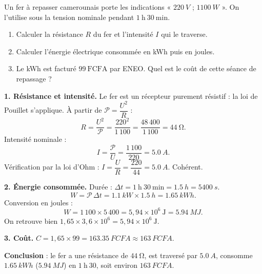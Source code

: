 \documentclass[11pt]{article}
\begin{document}
\begin{exoresolu}
Un fer à repasser camerounais porte les indications « $\SI{220}{V}$ ; $\SI{1100}{W}$ ». On l'utilise sous la tension nominale pendant $1~\mathrm{h}~30~\mathrm{min}$.
\begin{enumerate}
\item Calculer la résistance $R$ du fer et l'intensité $I$ qui le traverse.
\item Calculer l'énergie électrique consommée en kWh puis en joules.
\item Le kWh est facturé $99~\mathrm{FCFA}$ par ENEO. Quel est le coût de cette séance de repassage ?
\end{enumerate}
\tcblower
\textbf{1. Résistance et intensité.} Le fer est un récepteur purement résistif : la loi de Pouillet s'applique. À partir de $\mathcal{P} = \dfrac{U^2}{R}$ :
\[ R = \frac{U^2}{\mathcal{P}} = \frac{220^2}{1\,100} = \frac{48\,400}{1\,100} = \SI{44}{\ohm}. \]
Intensité nominale :
\[ I = \frac{\mathcal{P}}{U} = \frac{1\,100}{220} = \SI{5,0}{A}. \]
Vérification par la loi d'Ohm : $I = \dfrac{U}{R} = \dfrac{220}{44} = \SI{5,0}{A}$. Cohérent.

\textbf{2. Énergie consommée.} Durée : $\Delta t = 1~\mathrm{h}~30~\mathrm{min} = \SI{1,5}{h} = \SI{5400}{s}$.
\[ W = \mathcal{P}\,\Delta t = \SI{1,1}{kW} \times \SI{1,5}{h} = \SI{1,65}{kWh}. \]
Conversion en joules :
\[ W = 1\,100 \times 5\,400 = 5{,}94 \times 10^{6}~\mathrm{J} = \SI{5,94}{MJ}. \]
On retrouve bien $1{,}65 \times 3{,}6 \times 10^{6} = 5{,}94 \times 10^{6}~\mathrm{J}$.

\textbf{3. Coût.} $C = 1{,}65 \times 99 = \SI{163,35}{FCFA} \approx \SI{163}{FCFA}$.

\textbf{Conclusion} : le fer a une résistance de $\SI{44}{\ohm}$, est traversé par $\SI{5,0}{A}$, consomme $\SI{1,65}{kWh}$ ($\SI{5,94}{MJ}$) en $1~\mathrm{h}~30$, soit environ $\SI{163}{FCFA}$.
\end{exoresolu}
\end{document}
